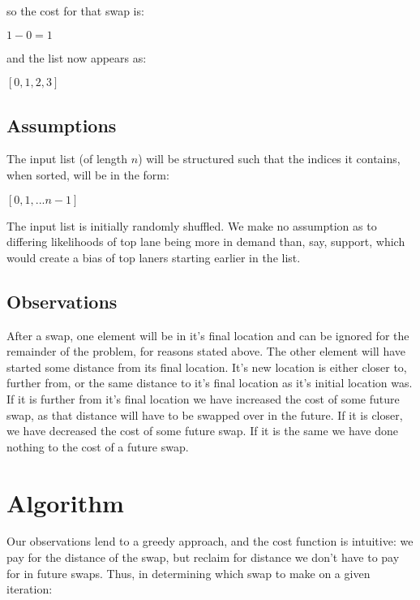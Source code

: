 \documentclass[11pt, oneside]{article}   	%
\begin{document}
so the cost for that swap is: \begin{center} $1 - 0 = 1$\end{center} and the list now appears as:

\begin{center}$[0, 1, 2, 3]$\end{center}

\subsection{Assumptions}

The input list (of length $n$) will be structured such that the indices it contains, when sorted, will be in the form: 

\begin{center}$[0, 1, ... n-1]$\end{center}

The input list is initially randomly shuffled. We make no assumption as to differing likelihoods of top lane being more in demand than, say, support, which would create a bias of top laners starting earlier in the list.

\subsection{Observations}

After a swap, one element will be in it's final location and can be ignored for the remainder of the problem, for reasons stated above. The other element will have started some distance from its final location. It's new location is either closer to, further from, or the same distance to it's final location as it's initial location was. If it is further from it's final location we have increased the cost of some future swap, as that distance will have to be swapped over in the future. If it is closer, we have decreased the cost of some future swap. If it is the same we have done nothing to the cost of a future swap.

\pagebreak

\section{Algorithm}

Our observations lend to a greedy approach, and the cost function is intuitive: we pay for the distance of the swap, but reclaim for distance we don't have to pay for in future swaps. Thus, in determining which swap to make on a given iteration:
\end{document}
